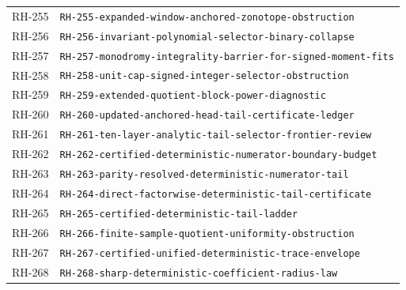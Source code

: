 \begin{longtable}{r >{\raggedright\arraybackslash}p{}}
RH-255 & \texttt{RH-\allowbreak{}255-\allowbreak{}expanded-\allowbreak{}window-\allowbreak{}anchored-\allowbreak{}zonotope-\allowbreak{}obstruction}\\
RH-256 & \texttt{RH-\allowbreak{}256-\allowbreak{}invariant-\allowbreak{}polynomial-\allowbreak{}selector-\allowbreak{}binary-\allowbreak{}collapse}\\
RH-257 & \texttt{RH-\allowbreak{}257-\allowbreak{}monodromy-\allowbreak{}integrality-\allowbreak{}barrier-\allowbreak{}for-\allowbreak{}signed-\allowbreak{}moment-\allowbreak{}fits}\\
RH-258 & \texttt{RH-\allowbreak{}258-\allowbreak{}unit-\allowbreak{}cap-\allowbreak{}signed-\allowbreak{}integer-\allowbreak{}selector-\allowbreak{}obstruction}\\
RH-259 & \texttt{RH-\allowbreak{}259-\allowbreak{}extended-\allowbreak{}quotient-\allowbreak{}block-\allowbreak{}power-\allowbreak{}diagnostic}\\
RH-260 & \texttt{RH-\allowbreak{}260-\allowbreak{}updated-\allowbreak{}anchored-\allowbreak{}head-\allowbreak{}tail-\allowbreak{}certificate-\allowbreak{}ledger}\\
RH-261 & \texttt{RH-\allowbreak{}261-\allowbreak{}ten-\allowbreak{}layer-\allowbreak{}analytic-\allowbreak{}tail-\allowbreak{}selector-\allowbreak{}frontier-\allowbreak{}review}\\
RH-262 & \texttt{RH-\allowbreak{}262-\allowbreak{}certified-\allowbreak{}deterministic-\allowbreak{}numerator-\allowbreak{}boundary-\allowbreak{}budget}\\
RH-263 & \texttt{RH-\allowbreak{}263-\allowbreak{}parity-\allowbreak{}resolved-\allowbreak{}deterministic-\allowbreak{}numerator-\allowbreak{}tail}\\
RH-264 & \texttt{RH-\allowbreak{}264-\allowbreak{}direct-\allowbreak{}factorwise-\allowbreak{}deterministic-\allowbreak{}tail-\allowbreak{}certificate}\\
RH-265 & \texttt{RH-\allowbreak{}265-\allowbreak{}certified-\allowbreak{}deterministic-\allowbreak{}tail-\allowbreak{}ladder}\\
RH-266 & \texttt{RH-\allowbreak{}266-\allowbreak{}finite-\allowbreak{}sample-\allowbreak{}quotient-\allowbreak{}uniformity-\allowbreak{}obstruction}\\
RH-267 & \texttt{RH-\allowbreak{}267-\allowbreak{}certified-\allowbreak{}unified-\allowbreak{}deterministic-\allowbreak{}trace-\allowbreak{}envelope}\\
RH-268 & \texttt{RH-\allowbreak{}268-\allowbreak{}sharp-\allowbreak{}deterministic-\allowbreak{}coefficient-\allowbreak{}radius-\allowbreak{}law}\\

\end{longtable}
